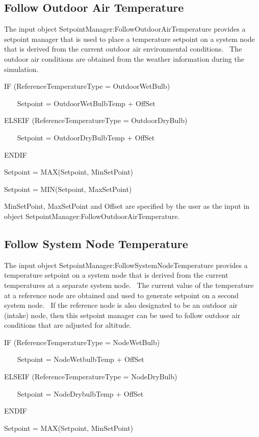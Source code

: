 \subsection{Follow Outdoor Air Temperature}\label{follow-outdoor-air-temperature}

The input object SetpointManager:FollowOutdoorAirTemperature provides a setpoint manager that is used to place a temperature setpoint on a system node that is derived from the current outdoor air environmental conditions.~ The outdoor air conditions are obtained from the weather information during the simulation.

IF (ReferenceTemperatureType = OutdoorWetBulb)

~~~ Setpoint = OutdoorWetBulbTemp + OffSet

ELSEIF (ReferenceTemperatureType = OutdoorDryBulb)

~~~ Setpoint = OutdoorDryBulbTemp + OffSet

ENDIF

Setpoint = MAX(Setpoint, MinSetPoint)

Setpoint = MIN(Setpoint, MaxSetPoint)

MinSetPoint, MaxSetPoint and Offset are specified by the user as the input in object SetpointManager:FollowOutdoorAirTemperature.

\subsection{Follow System Node Temperature}\label{follow-system-node-temperature}

The input object SetpointManager:FollowSystemNodeTemperature provides a temperature setpoint on a system node that is derived from the current temperatures at a separate system node.~ The current value of the temperature at a reference node are obtained and used to generate setpoint on a second system node.~ If the reference node is also designated to be an outdoor air (intake) node, then this setpoint manager can be used to follow outdoor air conditions that are adjusted for altitude.

IF (ReferenceTemperatureType = NodeWetBulb)

~~~ Setpoint = NodeWetbulbTemp + OffSet

ELSEIF (ReferenceTemperatureType = NodeDryBulb)

~~~ Setpoint = NodeDrybulbTemp + OffSet

ENDIF

Setpoint = MAX(Setpoint, MinSetPoint)

